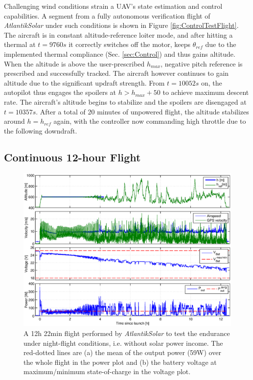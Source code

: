 Challenging wind conditions strain a UAV's state estimation and control capabilities. A segment from a fully autonomous verification flight of \textit{AtlantikSolar} under such conditions is shown in Figure \ref{fig:ControlTestFlight}. The aircraft is in constant altitude-reference loiter mode, and after hitting a thermal at $t=9760s$ it correctly switches off the motor, keeps $\theta_{ref}$ due to the implemented thermal compliance (Sec. \ref{sec:Control}) and thus gains altitude. When the altitude is above the user-prescribed $h_{max}$, negative pitch reference is prescribed and successfully tracked. The aircraft however continues to gain altitude due to the significant updraft strength. From $t=10052s$ on, the autopilot thus engages the spoilers at $h>h_{max}+50$ to achieve maximum descent rate. The aircraft's altitude begins to stabilize and the spoilers are disengaged at $t=10357s$. After a total of 20 minutes of unpowered flight, the altitude stabilizes around $h=h_{ref}$ again, with the controller now commanding high throttle due to the following downdraft. 

\subsection{Continuous 12-hour Flight} \label{sec:12hFlight}
  
\begin{figure}[tb]
    \centering
     \includegraphics[width=\linewidth]{images/12hFlight}
    \caption{A 12h 22min flight performed by \textit{AtlantikSolar} to test the endurance under night-flight conditions, i.e. without solar power income. The red-dotted lines are (a) the mean of the output power (59W) over the whole flight in the power plot and (b) the battery voltage at maximum/minimum state-of-charge in the voltage plot.} 
    \label{fig:12hFlight}
\end{figure}

